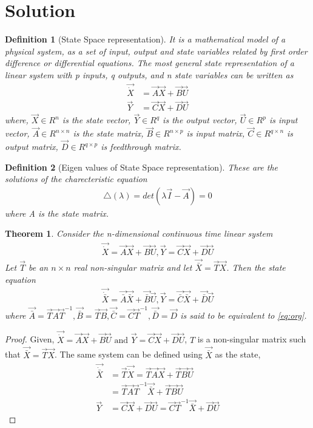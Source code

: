 \documentclass[journal,12pt,twocolumn]{IEEEtran}
\newtheorem{theorem}{Theorem}[section]
\newtheorem{definition}{Definition}[section]
\begin{document}
\section{Solution}
\begin{definition}[State Space representation]
It is a mathematical model of a physical system, as a set of input, output and state variables related by first order difference or differential equations. The most general state representation of a linear system with p inputs, q outputs, and n state variables can be written as
\begin{align}
    \vec{\dot X}&=\vec{A}\vec{X}+\vec{B}\vec{U}\\
    \vec{Y}&=\vec{C}\vec{X}+\vec{D}\vec{U}
\end{align}
where, $\vec{X}\in R^n$ is the state vector, $\vec{Y}\in R^q$ is the output vector, $\vec{U}\in R^p$ is input vector, $\vec{A}\in R^{n\times n}$ is the state matrix, $\vec{B}\in R^{n\times p}$ is input matrix, $\vec{C}\in R^{q\times n}$ is output matrix, $\vec{D}\in R^{q\times p}$ is feedthrough matrix.
\end{definition}
\begin{definition}[Eigen values of State Space representation] 
These are the solutions of the charecteristic equation
\begin{align}
    \triangle(\lambda)=det(\lambda \vec{I}-\vec{A})=0
\end{align}
where A is the state matrix. 
\end{definition}
\begin{theorem}
Consider the n-dimensional continuous time linear system
\begin{align}
    \vec{\dot X}=\vec{A}\vec{X}+\vec{B}\vec{U}, \vec{Y}=\vec{C}\vec{X}+\vec{D}\vec{U}
    \label{eq:org}
\end{align}
Let $\vec{T}$ be an $n\times n$ real non-singular matrix and let $\vec{\bar X}= \vec{T}\vec{X}$. Then the state equation 
\begin{align}
    \vec{\dot{\bar X}}=\vec{\bar A}\vec{\bar X}+ \vec{\bar B}\vec{U}, \vec{Y}=\vec{\bar C}\vec{\bar X}+\vec{\bar D}\vec{U}
    \label{eq:new}
\end{align}
where $\vec{\bar A}=\vec{T}\vec{A}\vec{T}^{-1}, \vec{\bar B}=\vec{T}\vec{B}, \vec{\bar C}=\vec{C}\vec{T}^{-1}, \vec{\bar D}=\vec{D}$ is said to be equivalent to \eqref{eq:org}.
\label{eq:th1}
\end{theorem}
\begin{proof}
Given, $\vec{\dot X}=\vec{A}\vec{X}+\vec{B}\vec{U} \text{ and } \vec{Y}=\vec{C}\vec{X}+\vec{D}\vec{U}$, $T$ is a non-singular matrix such that $\vec{\bar X}= \vec{T}\vec{X}$. The same system can be defined using $\vec{\bar X}$ as the state,
\begin{align}
    \vec{\dot{\bar X}}&=\vec{T}\vec{\dot X}=\vec{T}\vec{A}\vec{X}+\vec{T}\vec{B}\vec{U}\\
    &=\vec{T}\vec{A}\vec{T}^{-1}\vec{\bar X}+\vec{T}\vec{B}\vec{U}\\
    \vec{Y}&=\vec{C}\vec{X}+\vec{D}\vec{U}=\vec{C}\vec{T}^{-1}\vec{\bar X}+\vec{D}\vec{U}
\end{align}
\end{proof}
\end{document}
